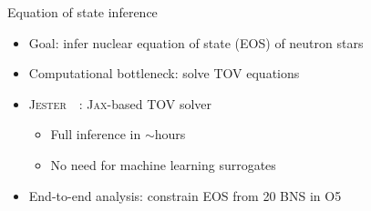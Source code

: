 \documentclass[usenames,dvipsnames,t]{beamer}
\newcommand{\ghlink}[1]{\href{https://github.com/#1}{\textcolor{black}{\faGithub}}}
\begin{document}
\begin{frame}{Equation of state inference}
  \def\x{2mm}

  \begin{itemize}
    \item Goal: infer nuclear equation of state (EOS) of neutron stars~\cite{Abac:2025saz}

    \vspace{\x}

    \item Computational bottleneck: solve TOV equations

    \vspace{\x}

    \item<2-> \textsc{Jester}~\ghlink{nuclear-multimessenger-astronomy/jester}~\cite{Wouters:2025zju}: \textsc{Jax}-based TOV solver
    \begin{itemize}
      \item Full inference in $\sim$hours
      \item No need for machine learning surrogates
    \end{itemize}

    \vspace{\x}

    \item<3-> End-to-end analysis: constrain EOS from 20 BNS in O5
  \end{itemize}

  \vspace{-3mm}

  \begin{columns}


\end{columns}
\end{frame}
\end{document}
